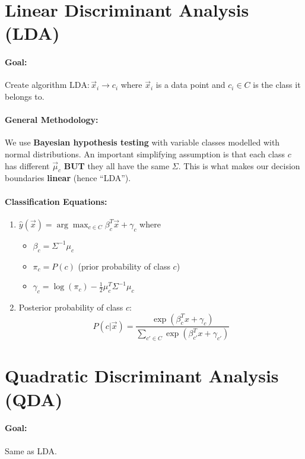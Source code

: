 \documentclass[a4paper,12pt]{report}
\begin{document}
\section{Linear Discriminant Analysis (LDA)}

\paragraph{Goal: } Create algorithm $\text{LDA}: \vec x_i \to c_i$ where $\vec x_i$ is a data point and $c_i\in C$ is the class it belongs to.

\paragraph{General Methodology: } We use \textbf{Bayesian hypothesis testing} with variable classes modelled with normal distributions. An important simplifying assumption is that each class $c$ has different $\vec \mu_c$ \textbf{BUT} they all have the same $\Sigma$. This is what makes our decision boundaries \textbf{linear} (hence ``LDA'').

\paragraph{Classification Equations: } 
\begin{enumerate}
\item $\hat y(\vec x) = \arg\max_{c\in C} \beta_c^T \vec x + \gamma_c$ where
\begin{itemize}
\item $\beta_c = \Sigma^{-1} \mu_c$
\item $\pi_c = P(c)$ (prior probability of class $c$)
\item $\gamma_c = \log(\pi_c) - \frac{1}{2} \mu_c^T \Sigma^{-1} \mu_c$
\end{itemize}

\item Posterior probability of class $c$: 
\begin{equation}
P(c | \vec x) = \frac{\exp(\beta_c^T x + \gamma_c)}{\sum_{c'\in C}^{} \exp(\beta_{c'}^T x + \gamma_{c'})} 
\end{equation}
\end{enumerate}


\section{Quadratic Discriminant Analysis (QDA)}

\paragraph{Goal: } Same as LDA. 
\end{document}
